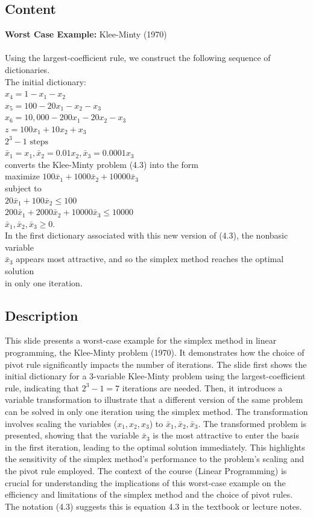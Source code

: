 \documentclass{article}%
\begin{document}
\subsection{Content}%

\textbf{Worst Case Example:} Klee-Minty (1970) \\
[CJ] \\
Using the largest-coefficient rule, we construct the following sequence of dictionaries. \\
The initial dictionary: \\
$x_4 = 1 - x_1 - x_2$ \\
$x_5 = 100 - 20x_1 - x_2 - x_3$ \\
$x_6 = 10,000 - 200x_1 - 20x_2 - x_3$ \\
$z = 100x_1 + 10x_2 + x_3$ \\
$2^3 - 1 \text{ steps}$ \\
$\bar{x}_1 = x_1, \bar{x}_2 = 0.01x_2, \bar{x}_3 = 0.0001x_3$ \\
converts the Klee-Minty problem (4.3) into the form \\
maximize $100\bar{x}_1 + 1000\bar{x}_2 + 10000\bar{x}_3$ \\
subject to \\
$20\bar{x}_1 + 100\bar{x}_2 \le 100$ \\
$200\bar{x}_1 + 2000\bar{x}_2 + 10000\bar{x}_3 \le 10000$ \\
$\bar{x}_1, \bar{x}_2, \bar{x}_3 \ge 0$. \\
In the first dictionary associated with this new version of (4.3), the nonbasic variable \\
$\bar{x}_3$ appears most attractive, and so the simplex method reaches the optimal solution \\
in only one iteration.
%
\subsection{Description}%
This slide presents a worst-case example for the simplex method in linear programming, the Klee-Minty problem (1970). It demonstrates how the choice of pivot rule significantly impacts the number of iterations. The slide first shows the initial dictionary for a 3-variable Klee-Minty problem using the largest-coefficient rule, indicating that $2^3 - 1 = 7$ iterations are needed. Then, it introduces a variable transformation to illustrate that a different version of the same problem can be solved in only one iteration using the simplex method. The transformation involves scaling the variables ($x_1, x_2, x_3$) to $\bar{x}_1, \bar{x}_2, \bar{x}_3$. The transformed problem is presented, showing that the variable $\bar{x}_3$ is the most attractive to enter the basis in the first iteration, leading to the optimal solution immediately. This highlights the sensitivity of the simplex method's performance to the problem's scaling and the pivot rule employed. The context of the course (Linear Programming) is crucial for understanding the implications of this worst-case example on the efficiency and limitations of the simplex method and the choice of pivot rules. The notation (4.3) suggests this is equation 4.3 in the textbook or lecture notes.%
\end{document}
